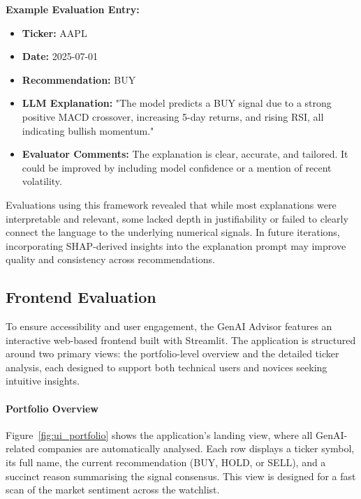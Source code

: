 \vspace{0.5cm}

\noindent
\textbf{Example Evaluation Entry:}

\begin{itemize}
  \item \textbf{Ticker:} AAPL  
  \item \textbf{Date:} 2025-07-01  
  \item \textbf{Recommendation:} BUY  
  \item \textbf{LLM Explanation:} "The model predicts a BUY signal due to a strong positive MACD crossover, increasing 5-day returns, and rising RSI, all indicating bullish momentum."
  \item \textbf{Evaluator Comments:} The explanation is clear, accurate, and tailored. It could be improved by including model confidence or a mention of recent volatility.
\end{itemize}

\medskip

Evaluations using this framework revealed that while most explanations were interpretable and relevant, some lacked depth in justifiability or failed to clearly connect the language to the underlying numerical signals. In future iterations, incorporating SHAP-derived insights into the explanation prompt may improve quality and consistency across recommendations.

\subsection{Frontend Evaluation}

To ensure accessibility and user engagement, the GenAI Advisor features an interactive web-based frontend built with Streamlit. The application is structured around two primary views: the portfolio-level overview and the detailed ticker analysis, each designed to support both technical users and novices seeking intuitive insights.

\paragraph{Portfolio Overview}
Figure~\ref{fig:ui_portfolio} shows the application’s landing view, where all GenAI-related companies are automatically analysed. Each row displays a ticker symbol, its full name, the current recommendation (BUY, HOLD, or SELL), and a succinct reason summarising the signal consensus. This view is designed for a fast scan of the market sentiment across the watchlist.

